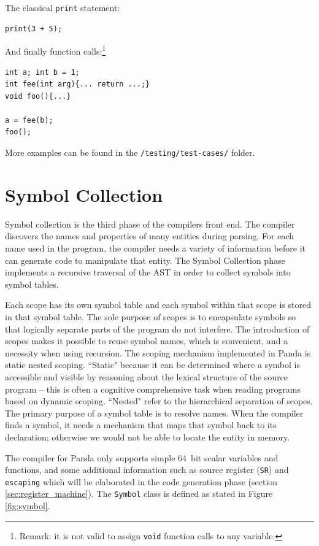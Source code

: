 The classical \texttt{print} statement:

\begin{verbatim}
print(3 + 5); 
\end{verbatim}

And finally function calls:\footnote{Remark: it is not valid to assign \texttt{void} function calls to any variable.}

\begin{verbatim}
int a; int b = 1;
int fee(int arg){... return ...;}
void foo(){...}

a = fee(b);
foo();
\end{verbatim}

More examples can be found in the \texttt{/testing/test-cases/} folder.

\newpage

\section{Symbol Collection}\label{sec:symbol_collection}
Symbol collection is the third phase of the compilers front end. The compiler discovers the names and properties of many entities during parsing. For each name used in the program, the compiler needs a variety of information before it can generate code to manipulate that entity. The Symbol Collection phase implements a recursive traversal of the AST in order to collect symbols into symbol tables.

Each scope has its own symbol table and each symbol within that scope is stored in that symbol table. The sole purpose of scopes is to encapsulate symbols so that logically separate parts of the program do not interfere. The introduction of scopes makes it possible to reuse symbol names, which is convenient, and a necessity when using recursion. The scoping mechanism implemented in Panda is static nested scoping. ``Static" because it can be determined where a symbol is accessible and visible by reasoning about the lexical structure of the source program -- this is often a cognitive comprehensive task when reading programs based on dynamic scoping. ``Nested" refer to the hierarchical separation of scopes. The primary purpose of a symbol table is to resolve names. When the compiler finds a symbol, it needs a mechanism that maps that symbol back to its declaration; otherwise we would not be able to locate the entity in memory.

The compiler for Panda only supports simple \SI{64}{bit} scalar variables and functions, and some additional information such as source register (\texttt{SR}) and \texttt{escaping} which will be elaborated in the code generation phase (section \ref{sec:register_machine}). The \texttt{Symbol} class is defined as stated in Figure \ref{fig:symbol}.

